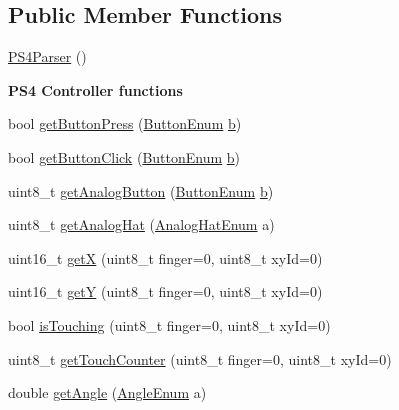 \subsection*{\-Public \-Member \-Functions}
\begin{DoxyCompactItemize}
\item 
\hyperlink{class_p_s4_parser_a3ef06f8737f1088dbdbbc351b576c1cf}{\-P\-S4\-Parser} ()
\end{DoxyCompactItemize}
\begin{Indent}{\bf \-P\-S4 \-Controller functions}\par
\begin{DoxyCompactItemize}
\item 
bool \hyperlink{class_p_s4_parser_ad352f30e4ab772246574bbf654248906}{get\-Button\-Press} (\hyperlink{controller_enums_8h_a94f7389d205c78830a5441370d7870fd}{\-Button\-Enum} \hyperlink{_p_s4_parser_8h_a4313c9563516f94387762ab05763456b}{b})
\item 
bool \hyperlink{class_p_s4_parser_a92a4ea3d328426b9f86be05cabaad91c}{get\-Button\-Click} (\hyperlink{controller_enums_8h_a94f7389d205c78830a5441370d7870fd}{\-Button\-Enum} \hyperlink{_p_s4_parser_8h_a4313c9563516f94387762ab05763456b}{b})
\item 
uint8\-\_\-t \hyperlink{class_p_s4_parser_a66151c4e4601f80492cd5b2451a2f87a}{get\-Analog\-Button} (\hyperlink{controller_enums_8h_a94f7389d205c78830a5441370d7870fd}{\-Button\-Enum} \hyperlink{_p_s4_parser_8h_a4313c9563516f94387762ab05763456b}{b})
\item 
uint8\-\_\-t \hyperlink{class_p_s4_parser_a9b11c5b27f9c9501fdb4f616cb3b194c}{get\-Analog\-Hat} (\hyperlink{controller_enums_8h_a34dad8f0a0927471137c403216597093}{\-Analog\-Hat\-Enum} a)
\item 
uint16\-\_\-t \hyperlink{class_p_s4_parser_aa149326d97c6231087f81d954a994493}{get\-X} (uint8\-\_\-t finger=0, uint8\-\_\-t xy\-Id=0)
\item 
uint16\-\_\-t \hyperlink{class_p_s4_parser_a9972eeb87f2ed4a96dcdccf2dabbbc5a}{get\-Y} (uint8\-\_\-t finger=0, uint8\-\_\-t xy\-Id=0)
\item 
bool \hyperlink{class_p_s4_parser_a6770a72c17062c2e00fb3602435fcade}{is\-Touching} (uint8\-\_\-t finger=0, uint8\-\_\-t xy\-Id=0)
\item 
uint8\-\_\-t \hyperlink{class_p_s4_parser_a0b3de008ae8aaa057c571081b1b64e88}{get\-Touch\-Counter} (uint8\-\_\-t finger=0, uint8\-\_\-t xy\-Id=0)
\item 
double \hyperlink{class_p_s4_parser_ac4b7e6c29af23a88d41a83e82c87c888}{get\-Angle} (\hyperlink{controller_enums_8h_a7c7824a10a9ffa8fea85602fcf4d84e6}{\-Angle\-Enum} a)

\end{DoxyCompactItemize}
\end{Indent}
